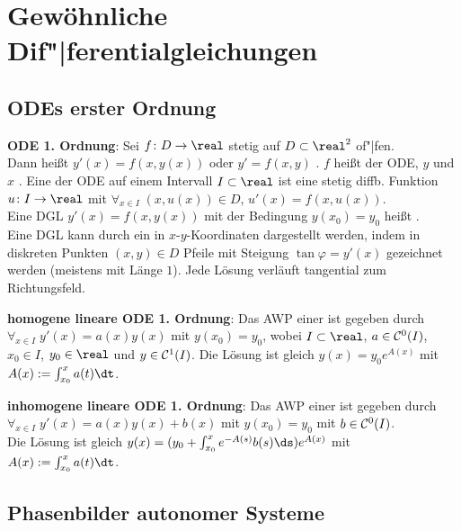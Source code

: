 \chapter{%
    Gewöhnliche Dif"|ferentialgleichungen%
}

\section{%
    ODEs erster Ordnung%
}

\textbf{ODE 1. Ordnung}:
Sei $f\colon D \to \real$ stetig auf $D \subset \real^2$ of"|fen.\\
Dann heißt $y'(x) = f(x, y(x))$ oder $y' = f(x, y)$ .
$f$ heißt  der ODE,
$y$  und $x$ .
Eine  der ODE auf einem Intervall $I \subset \real$ ist eine
stetig diffb. Funktion $u\colon I \to \real$ mit
$\forall_{x \in I}\; (x, u(x)) \in D$, $u'(x) = f(x, u(x))$.\\
Eine DGL $y'(x) = f(x, y(x))$ mit der Bedingung $y(x_0) = y_0$ heißt
.\\
Eine DGL kann durch ein  in $x$-$y$-Koordinaten dargestellt werden,
indem in diskreten Punkten $(x, y) \in D$ Pfeile mit Steigung $\tan \varphi = y'(x)$
gezeichnet werden (meistens mit Länge $1$).
Jede Lösung verläuft tangential zum Richtungsfeld.

\linie

\textbf{homogene lineare ODE 1. Ordnung}:
Das AWP einer  ist gegeben durch
$\forall_{x \in I}\; y'(x) = a(x) y(x)$ mit $y(x_0) = y_0$,
wobei $I \subset \real$, $a \in \mathcal{C}^0(I)$,
$x_0 \in I$, $y_0 \in \real$ und $y \in \mathcal{C}^1(I)$.
Die Lösung ist gleich $y(x) = y_0 e^{A(x)}$ mit $A(x) := \int_{x_0}^x a(t) \dt$.

\textbf{inhomogene lineare ODE 1. Ordnung}:
Das AWP einer  ist gegeben durch
$\forall_{x \in I}\; y'(x) = a(x) y(x) + b(x)$ mit $y(x_0) = y_0$
mit $b \in \mathcal{C}^0(I)$.\\
Die Lösung ist gleich $y(x) = (y_0 + \int_{x_0}^x e^{-A(s)} b(s) \ds) e^{A(x)}$
mit $A(x) := \int_{x_0}^x a(t) \dt$.

\section{%
    Phasenbilder autonomer Systeme%
}

